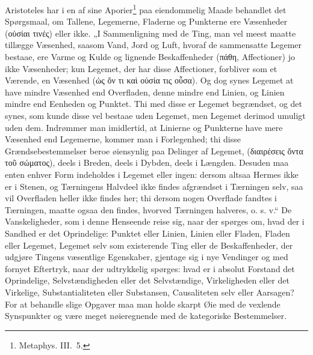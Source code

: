 \documentclass[11pt]{book}
\newcommand{\opage}[1]{\marginnote{\footnotesize\textit{[#1]}}}
\begin{document}
Aristoteles har i en af sine Aporier\footnote{Metaphys. III.\ 5.} paa
eiendommelig Maade behandlet det Spørgsmaal, om Tallene, Legemerne,
Fladerne og Punkterne ere Væsenheder (οὐσίαι τινές) eller ikke. „I
Sammenligning med de Ting, man vel meest maatte tillægge Væsenhed,
saasom Vand, Jord og Luft, hvoraf de sammensatte Legemer bestaae, ere
Varme og Kulde og lignende Beskaffenheder (πάθη, Affectioner) jo ikke
Væsenheder; kun Legemet, der har disse Affectioner, forbliver som et
Værende, en Væsenhed (ὡς ὄν τι καὶ οὐσία τις οὖσα). Og dog synes Legemet
at have mindre Væsenhed end Overfladen, denne mindre end Linien, og
Linien mindre end Eenheden og Punktet. Thi med disse er Legemet
begrændset, og det synes, som kunde disse vel bestaae uden Legemet, men
Legemet derimod umuligt uden dem. Indrømmer man imidlertid, at Linierne
og Punkterne have mere Væsenhed end Legemerne, kommer man i Forlegenhed;
thi disse Grændsebestemmelser beroe øiensynlig paa Delinger af Legemet,
(διαιρέσεις ὄντα τοῦ σώματος), deels i Breden, deels i Dybden, deels i
Længden. Desuden maa enten enhver Form indeholdes i Legemet eller ingen:
dersom altsaa Hermes ikke er i Stenen, og Tærningens Halvdeel ikke findes
afgrændset i Tærningen selv, saa vil Overfladen heller ikke findes her;
thi dersom nogen Overflade fandtes i Tærningen, maatte ogsaa den findes,
hvorved Tærningen halveres, o. s. v.“ De Vanskeligheder, som i denne
Henseende reise sig, naar der spørges om, hvad der i Sandhed er det
Oprindelige: Punktet eller Linien, Linien eller Fladen, Fladen eller
Legemet, Legemet selv som existerende Ting eller de Beskaffenheder, der
udgjøre Tingens væsentlige Egenskaber, gjentage sig i nye Vendinger og
med fornyet Eftertryk, naar der udtrykkelig spørges: hvad er i absolut
Forstand det Oprindelige, Selvstændigheden eller det
\opage{115} \setcounter{footnote}{0}%
Selvstændige, Virkeligheden eller det Virkelige, Substantialiteten eller
Substansen, Causaliteten selv eller Aarsagen? For at behandle slige
Opgaver maa man holde skarpt Øie med de vexlende Synspunkter og være
meget nøieregnende med de kategoriske Bestemmelser.
\end{document}
